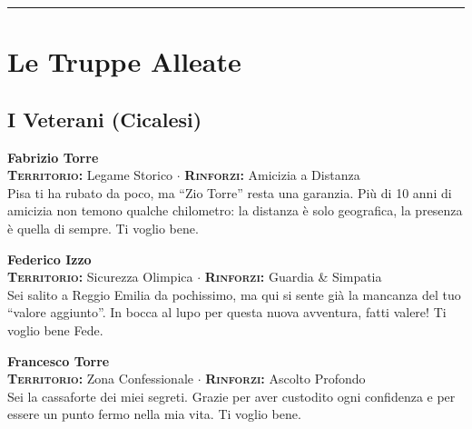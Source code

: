 \vspace{0.6cm}
\begin{center} \rule{0.5\linewidth}{0.5pt} \end{center}


\section*{Le Truppe Alleate}

\subsection*{I Veterani (Cicalesi)}

\noindent\begin{minipage}{\linewidth}
\textbf{Fabrizio Torre} \\
{\footnotesize \textbf{\textsc{Territorio:}} Legame Storico $\cdot$ \textbf{\textsc{Rinforzi:}} Amicizia a Distanza} \\
Pisa ti ha rubato da poco, ma ``Zio Torre'' resta una garanzia. Più di 10 anni di amicizia non temono qualche chilometro: la distanza è solo geografica, la presenza è quella di sempre. Ti voglio bene.
\end{minipage}
\vspace{0.6cm}

\noindent\begin{minipage}{\linewidth}
\textbf{Federico Izzo} \\
{\footnotesize \textbf{\textsc{Territorio:}} Sicurezza Olimpica $\cdot$ \textbf{\textsc{Rinforzi:}} Guardia \& Simpatia} \\
Sei salito a Reggio Emilia da pochissimo, ma qui si sente già la mancanza del tuo ``valore aggiunto''. In bocca al lupo per questa nuova avventura, fatti valere! Ti voglio bene Fede.
\end{minipage}
\vspace{0.6cm}

\noindent\begin{minipage}{\linewidth}
\textbf{Francesco Torre} \\
{\footnotesize \textbf{\textsc{Territorio:}} Zona Confessionale $\cdot$ \textbf{\textsc{Rinforzi:}} Ascolto Profondo} \\
Sei la cassaforte dei miei segreti. Grazie per aver custodito ogni confidenza e per essere un punto fermo nella mia vita. Ti voglio bene.
\end{minipage}
\vspace{0.6cm}

